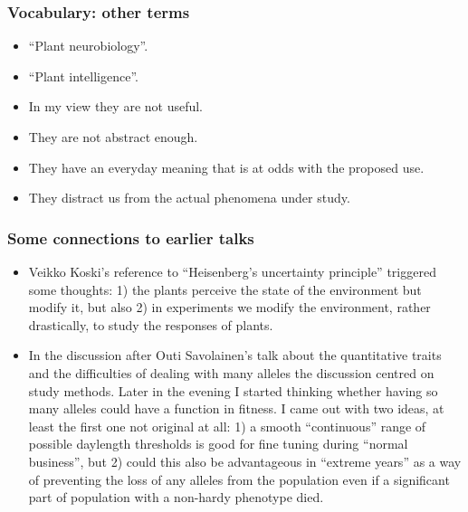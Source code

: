 \documentclass[10pt]{beamer}\usepackage[]{graphicx}\usepackage[]{color}
\begin{document}
\begin{frame}[allowframebreaks,t]
\printbibliography
\end{frame}

\begin{frame}%
  \frametitle{Vocabulary: other terms}
  \begin{itemize}
    \item ``Plant neurobiology''.
    \item ``Plant intelligence''.
    \item In my view they are not useful.
    \item They are not abstract enough.
    \item They have an everyday meaning that is at odds with the proposed use.
    \item They distract us from the actual phenomena under study.
  \end{itemize}
\end{frame}

\begin{frame}
  \frametitle{Some connections to earlier talks}
  \begin{itemize}
    \item Veikko Koski's reference to ``Heisenberg's uncertainty principle'' triggered some thoughts: 1) the plants perceive the state of the environment but modify it, but also 2) in experiments we modify the environment, rather drastically, to study the responses of plants.
    \item In the discussion after Outi Savolainen's talk about the quantitative traits and the difficulties of dealing with many alleles the discussion centred on study methods. Later in the evening I started thinking whether having so many alleles could have a function in fitness. I came out with two ideas, at least the first one not original at all: 1) a smooth ``continuous'' range of possible daylength thresholds is good for fine tuning during ``normal business'', but 2) could this also be advantageous in ``extreme years'' as a way of preventing the loss of any alleles from the population even if a significant part of population with a non-hardy phenotype died.
  \end{itemize}
\end{frame}
\end{document}
